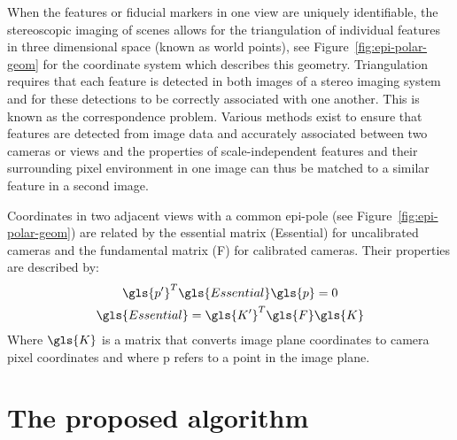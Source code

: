 \documentclass{osa-article}
\begin{document}

When the features or fiducial markers in one view are uniquely identifiable, the stereoscopic imaging of scenes allows for the triangulation of individual features in three dimensional space (known as world points), see Figure~\ref{fig:epi-polar-geom} for the coordinate system which describes this geometry. %
Triangulation requires that each feature is detected in both images of a stereo imaging system and for these detections to be correctly associated with one another.
This is known as the correspondence problem.
Various methods exist to ensure that features are detected from image data and accurately associated between two cameras or views \cite{?} and the properties of scale-independent features and their surrounding pixel environment in one image can thus be matched to a similar feature in a second image.

Coordinates in two adjacent views with a common epi-pole (see Figure~\ref{fig:epi-polar-geom}) are related by the essential matrix (\gls{Essential}) for uncalibrated cameras and the fundamental matrix (\gls{F}) for calibrated cameras.
Their properties are described by:
\begin{gather}
\gls{p'}^T \gls{Essential} \gls{p} = 0 \label{eq:pEp}\\
\gls{Essential} = \gls{K'}^T \gls{F} \gls{K} %
\end{gather}
Where \(\gls{K}\) is a matrix that converts image plane coordinates to camera pixel coordinates and where \gls{p} refers to a point in the image plane.

\section{The proposed algorithm}
\end{document}
